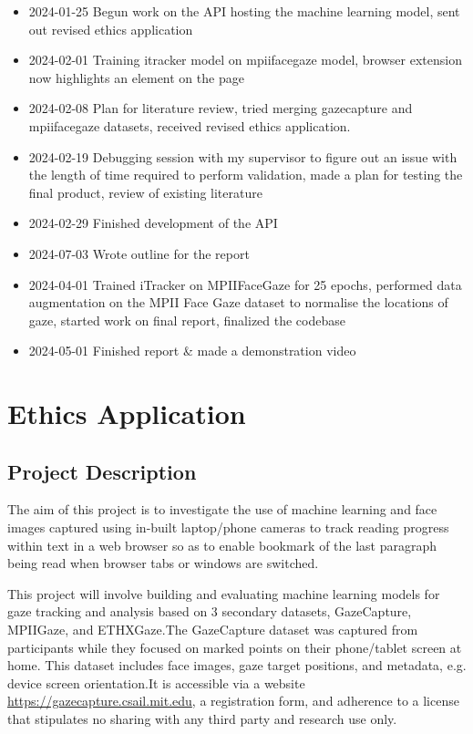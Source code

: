 \documentclass{report}
\begin{document}
\begin{itemize}
    \item 2024-01-25 Begun work on the API hosting the machine learning model, sent out revised ethics application 
    \item 2024-02-01 Training itracker model on mpiifacegaze model, browser extension now highlights an element on the page 
    \item 2024-02-08 Plan for literature review, tried merging gazecapture and mpiifacegaze datasets, received revised ethics application. 
    \item 2024-02-19 Debugging session with my supervisor to figure out an issue with the length of time required to perform validation, made a plan for testing the final product, review of existing literature 
    \item 2024-02-29 Finished development of the API 
    \item 2024-07-03 Wrote outline for the report
    \item 2024-04-01 Trained iTracker on MPIIFaceGaze for 25 epochs, performed data augmentation on the MPII Face Gaze dataset to normalise the locations of gaze, started work on final report, finalized the codebase 
    \item 2024-05-01 Finished report \& made a demonstration video 
\end{itemize}

\chapter{Ethics Application}\label{sec:ethics-app}

\section*{Project Description}

The aim of this project is to investigate the use of machine learning and face images captured using in-built laptop/phone cameras to track reading progress within text in a web browser so as to enable bookmark of the last paragraph being read when browser tabs or windows are switched.

This project will involve building and evaluating machine learning models for gaze tracking and analysis based on 3 secondary datasets, GazeCapture, MPIIGaze, and ETHXGaze.The GazeCapture \cite{krafka2016eye} dataset was captured from participants while they focused on marked points on their phone/tablet screen at home. This dataset includes face images, gaze target positions, and metadata, e.g. device screen orientation.It is accessible via a website \url{https://gazecapture.csail.mit.edu}, a registration form, and adherence to a license that stipulates no sharing with any third party and research use only.
\end{document}
